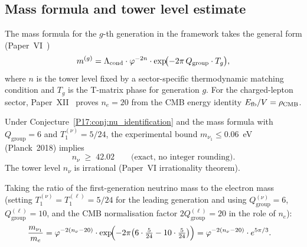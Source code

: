 \subsection{Mass formula and tower level estimate}
\label{P17:sec:nu_tower}
The mass formula for the $g$-th generation in the framework takes the
general form (Paper~VI~\cite{Paper6})
\begin{equation}
  m^{(g)} = \Lambda_{\mathrm{cond}}\cdot
    \varphi^{-2n}\cdot
    \exp\!\bigl(-2\pi\,Q_{\mathrm{group}}\cdot T_g\bigr),
  \label{P17:eq:mass_formula}
\end{equation}
where $n$ is the tower level fixed by a sector-specific thermodynamic
matching condition and $T_g$ is the T-matrix phase for generation $g$.
For the charged-lepton sector, Paper~XII~\cite{Paper12} proves
$n_e=20$ from the CMB energy identity $E_{\mathrm{fb}}/V=\rho_{\mathrm{CMB}}$.

\begin{proposition}
\label{P17:prop:nu_tower_bound}
Under Conjecture~\ref{P17:conj:nu_identification} and the mass formula
with $Q_{\mathrm{group}}=6$ and $T_1^{(\nu)}=5/24$,
the experimental bound $m_{\nu_1}\leq0.06$~eV (Planck~2018) implies
\begin{equation}
  n_\nu \;\geq\; 42.02 \qquad\text{(exact, no integer rounding)}.
  \label{P17:eq:nu_tower_bound}
\end{equation}
The tower level $n_\nu$ is irrational (Paper~VI irrationality theorem).
\end{proposition}

Taking the ratio of the first-generation neutrino mass to the electron
mass (setting $T_1^{(\nu)}=T_1^{(\ell)}=5/24$ for the leading
generation and using $Q_{\mathrm{group}}^{(\nu)}=6$,
$Q_{\mathrm{group}}^{(\ell)}=10$, and the CMB normalisation factor
$2Q_{\mathrm{group}}^{(\ell)}=20$ in the role of $n_e$):
\begin{align}
  \frac{m_{\nu_1}}{m_e}
  &= \varphi^{-2(n_\nu-20)}\cdot
     \exp\!\Bigl(-2\pi\bigl(6\cdot\tfrac{5}{24}-10\cdot\tfrac{5}{24}\bigr)\Bigr)
   = \varphi^{-2(n_\nu-20)}\cdot e^{5\pi/3}.
  \label{P17:eq:nu_me_ratio}
\end{align}

